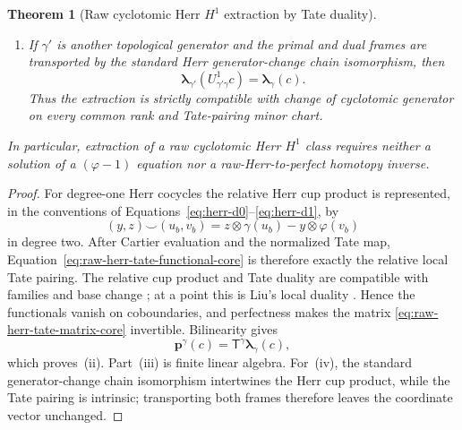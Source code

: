 \documentclass[11pt]{article}
\newtheorem{theorem}{Theorem}[section]
\theoremstyle{definition}
\begin{document}
\begin{theorem}[Raw cyclotomic Herr $H^1$ extraction by Tate duality]
\begin{enumerate}[label=\textnormal{(\roman*)}]
\item If $\gamma'$ is another topological generator and the primal and dual frames are transported by the standard Herr generator-change chain isomorphism, then
\begin{equation}\label{eq:raw-herr-generator-invariance-core}
 \boldsymbol\lambda_{\gamma'}(U^1_{\gamma'\gamma}c)
 =\boldsymbol\lambda_{\gamma}(c).
\end{equation}
Thus the extraction is strictly compatible with change of cyclotomic generator on every common rank and Tate-pairing minor chart.
\end{enumerate}
In particular, extraction of a raw cyclotomic Herr $H^1$ class requires neither a solution of a $(\varphi-1)$ equation nor a raw-Herr-to-perfect homotopy inverse.
\end{theorem}

\begin{proof}
For degree-one Herr cocycles the relative Herr cup product is represented, in the conventions of Equations~\eqref{eq:herr-d0}--\eqref{eq:herr-d1}, by
\[
 (y,z)\smile(u_b,v_b)
 =z\otimes\gamma(u_b)-y\otimes\varphi(v_b)
\]
in degree two.  After Cartier evaluation and the normalized Tate map, Equation~\eqref{eq:raw-herr-tate-functional-core} is therefore exactly the relative local Tate pairing.  The relative cup product and Tate duality are compatible with families and base change \cite{KPXFamilies}; at a point this is Liu's local duality \cite{LiuCohomology}.  Hence the functionals vanish on coboundaries, and perfectness makes the matrix \eqref{eq:raw-herr-tate-matrix-core} invertible.  Bilinearity gives
\[
 \mathbf p^{\gamma}(c)=\mathsf T^{\gamma}\boldsymbol\lambda_{\gamma}(c),
\]
which proves~(ii).  Part~(iii) is finite linear algebra.  For~(iv), the standard generator-change chain isomorphism intertwines the Herr cup product, while the Tate pairing is intrinsic; transporting both frames therefore leaves the coordinate vector unchanged.
\end{proof}
\end{document}
